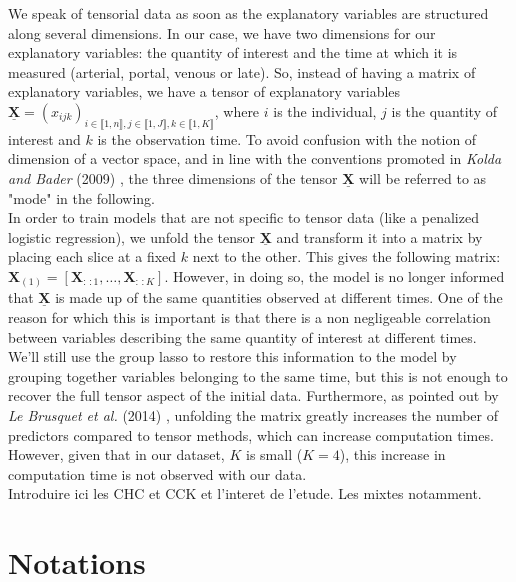 \documentclass[10pt]{article}
\begin{document}
We speak of tensorial data as soon as the explanatory variables are structured along several dimensions. In our case, we have two dimensions for our explanatory variables: the quantity of interest and the time at which it is measured (arterial, portal, venous or late). So, instead of having a matrix of explanatory variables, we have a tensor of explanatory variables $\underline{\mathbf{X}} = (x_{ijk})_{i \in \llbracket 1, n \rrbracket, j \in \llbracket 1, J \rrbracket, k \in \llbracket 1, K \rrbracket}$, where $i$ is the individual, $j$ is the quantity of interest and $k$ is the observation time. To avoid confusion with the notion of dimension of a vector space, and in line with the conventions promoted in \textit{Kolda and Bader} (2009) \cite{conventions}, the three dimensions of the tensor $\underline{\mathbf{X}}$ will be referred to as "mode" in the following.\\
\indent In order to train models that are not specific to tensor data (like a penalized logistic regression), we unfold the tensor $\underline{\mathbf{X}}$ and transform it into a matrix by placing each slice at a fixed $k$ next to the other. This gives the following matrix: $\mathbf{X}_{(1)} = [\mathbf{X}_{:\,:1}, \ldots, \mathbf{X}_{:\,:K}]$. However, in doing so, the model is no longer informed that $\underline{\mathbf{X}}$ is made up of the same quantities observed at different times. One of the reason for which this is important is that there is a non negligeable correlation between variables describing the same quantity of interest at different times. We'll still use the group lasso to restore this information to the model by grouping together variables belonging to the same time, but this is not enough to recover the full tensor aspect of the initial data. Furthermore, as pointed out by \textit{Le Brusquet et al.} (2014) \cite{multi_rank_1}, unfolding the matrix greatly increases the number of predictors compared to tensor methods, which can increase computation times. However, given that in our dataset, $K$ is small ($K = 4$), this increase in computation time is not observed with our data.\\

Introduire ici les CHC et CCK et l'interet de l'etude. Les mixtes notamment.

\section{Notations}
\end{document}
